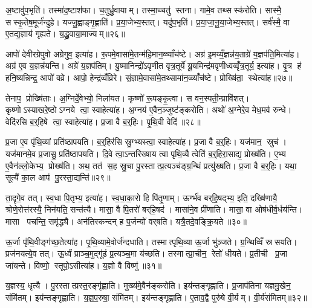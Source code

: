 अ॒ष्टावु॑प॒भृति॑। तस्मा॑द॒ष्टाश॑फा। च॒तुर्ध्रु॒वायाम्। तस्मा॒च्चतु॑ स्तना। गामे॒व तथ्सस्क॑रोति। सास्मै॒ सस्कृ॒तेष॒मूर्ज॑न्दुहे। यज्जु॒ह्वाङ्गृ॒ह्णाति॑। प्र॒या॒जेभ्य॒स्तत्। यदु॑प॒भृति॑। प्र॒या॒जा॒नू॒या॒जेभ्य॒स्तत्। सर्व॑स्मै॒ वा ए॒तद्य॒ज्ञाय॑ गृह्यते। य॒द्ध्रु॒वाया॒माज्यम्॥२६॥\anuvakamend[अ॒भि॒घा॒रय॑ति गृह्णाति ध्रु॒वाया॒ञ्चतु॑ष्पदी प्रयाजानूया॒जेभ्य॒स्तद्द्वे च॑]

आपो॑ देवीरग्रेपुवो अग्रेगुव॒ इत्या॑ह। रू॒पमे॒वासा॑मे॒तन्म॑हि॒मान॒व्व्याँच॑ष्टे। अग्र॑ इ॒मय्यँ॒ज्ञन्न॑य॒ताग्रे॑ य॒ज्ञप॑ति॒मित्या॑ह। अग्र॑ ए॒व य॒ज्ञन्न॑यन्ति। अग्रे॑ य॒ज्ञप॑तिम्। यु॒ष्मानिन्द्रो॑ऽवृणीत वृत्र॒तूर्ये॑ यू॒यमिन्द्र॑मवृणीध्वव्वृँत्र॒तूर्य॒ इत्या॑ह। वृ॒त्र ह॑ हनि॒ष्यन्निन्द्र॒ आपो॑ वव्रे। आपो॒ हेन्द्र॑व्वँव्रिरे। सं॒ज्ञामे॒वासा॑मे॒तथ्सामा॑न॒व्व्याँच॑ष्टे। प्रोख्षि॑ता॒ स्थेत्या॑ह॥२७॥

तेनाप॒ प्रोख्षि॑ताः। अ॒ग्निर्दे॒वेभ्यो॒ निला॑यत। कृष्णो॑ रू॒पङ्कृ॒त्वा। स वन॒स्पती॒न्प्रावि॑शत्। कृष्णोऽस्याखरे॒ष्ठोऽग्नये त्वा॒ स्वाहेत्या॑ह। अ॒ग्नय॑ ए॒वैन॒ञ्जुष्ट॑ङ्करोति। अथो॑ अ॒ग्नेरे॒व मेध॒मव॑ रुन्धे। वेदि॑रसि ब॒र्॒हिषे त्वा॒ स्वाहेत्या॑ह। प्र॒जा वै ब॒र्॒हिः। पृ॒थि॒वी वेदि॑॥२८॥

प्र॒जा ए॒व पृ॑थि॒व्यां प्रति॑ष्ठापयति। ब॒र्॒हिर॑सि स्रु॒ग्भ्यस्त्वा॒ स्वाहेत्या॑ह। प्र॒जा वै ब॒र्॒हिः। यज॑मान॒ स्रुच॑। यज॑मानमे॒व प्र॒जासु॒ प्रति॑ष्ठापयति। दि॒वे त्वा॒ऽन्तरि॑ख्षाय त्वा पृथि॒व्यै त्वेति॑ ब॒र्॒हिरा॒साद्य॒ प्रोख्ष॑ति। ए॒भ्य ए॒वैन॑ल्लो॒केभ्य॒ प्रोख्ष॑ति। अथ॒ तत॑ स॒ह स्रु॒चा पु॒रस्तात्प्र॒त्यञ्च॑ङ्ग्र॒न्थिं प्रत्यु॑ख्षति। प्र॒जा वै ब॒र्॒हिः। यथा॒ सूत्यै॑ का॒ल आप॑ पु॒रस्ता॒द्यन्ति॑॥२९॥

ता॒दृगे॒व तत्। स्व॒धा पि॒तृभ्य॒ इत्या॑ह। स्व॒धा॒का॒रो हि पि॑तृ॒णाम्। ऊर्ग्भ॑व बर्‌हि॒षद्भ्य॒ इति॒ दख्षि॑णायै॒ श्रोणे॒रोत्त॑रस्यै॒ निन॑यति॒ सन्त॑त्यै। मासा॒ वै पि॒तरो॑ बर्‌हि॒षद॑। मासा॑ने॒व प्री॑णाति। मासा॒ वा ओष॑धीर्व॒र्धय॑न्ति। मासा पचन्ति॒ समृ॑द्ध्यै। अन॑तिस्कन्दन् ह प॒र्जन्यो॑ वर्‌षति। यत्रै॒तदे॒वङ्क्रि॒यते॥३०॥

ऊ॒र्जा पृ॑थि॒वीङ्ग॑च्छ॒तेत्या॑ह। पृ॒थि॒व्यामे॒वोर्ज॑न्दधाति। तस्मात्पृथि॒व्या ऊ॒र्जा भु॑ञ्जते। ग्र॒न्थिव्विँ स्रसयति। प्रज॑नयत्ये॒व तत्। ऊ॒र्ध्वं प्राञ्च॒मुद्गू॑ढं प्र॒त्यञ्च॒मा य॑च्छति। तस्मात्प्रा॒चीन॒ रेतो॑ धीयते। प्र॒तीची प्र॒जा जा॑यन्ते। विष्णो॒ स्तूपो॒ऽसीत्या॑ह। य॒ज्ञो वै विष्णु॑॥३१॥

य॒ज्ञस्य॒ धृत्यै। पु॒रस्तात्प्रस्त॒रङ्गृ॑ह्णाति। मुख्य॑मे॒वैन॑ङ्करोति। इय॑न्तङ्गृह्णाति। प्र॒जाप॑तिना यज्ञमु॒खेन॒ संमि॑तम्। इय॑न्तङ्गृह्णाति। य॒ज्ञ॒प॒रुषा॒ संमि॑तम्। इय॑न्तङ्गृह्णाति। ए॒ताव॒द्वै पुरु॑षे वी॒र्यम्। वी॒र्य॑संमितम्॥३२॥

